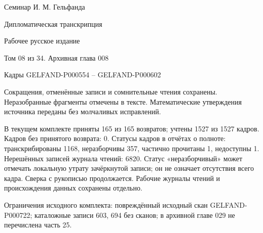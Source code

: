 \documentclass[11pt]{article}
\theoremstyle{definition}
\theoremstyle{remark}
\begin{document}
\begin{center}
{\Large Семинар И. М. Гельфанда}\par\medskip
{\LARGE Дипломатическая транскрипция}\par\bigskip
{\large Рабочее русское издание}\par\medskip
{\large Том 08 из 34. Архивная глава 008}\par\bigskip
Кадры GELFAND-P000554 -- GELFAND-P000602\par
\end{center}
\medskip
Сокращения, отменённые записи и сомнительные чтения сохранены.
Неразобранные фрагменты отмечены в тексте. Математические утверждения
источника переданы без молчаливых исправлений.

В текущем комплекте приняты 165 из 165 возвратов; учтены 1527 из 1527 кадров. Кадров без принятого возврата: 0.
Статусы кадров в отчётах о полноте: транскрибированы 1168, неразборчивы 357, частично прочитаны 1, недоступны 1.
Нерешённых записей журнала чтений: 6820.
Статус «неразборчивый» может отмечать локальную утрату зачёркнутой записи;
он не означает отсутствия всего кадра.
Сверка с рукописью продолжается. Рабочие журналы чтений и происхождения
данных сохранены отдельно.

Ограничения исходного комплекта: повреждённый исходный скан GELFAND-P000722; каталожные записи 603, 694 без сканов; в архивной главе 029 не перечислена часть 25.
\end{document}
